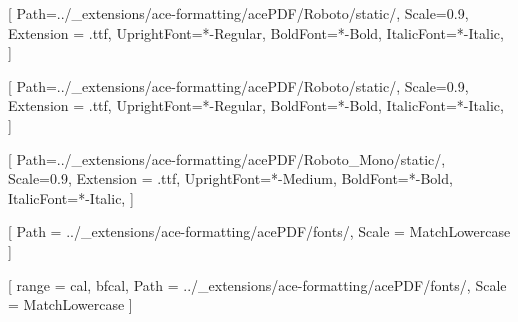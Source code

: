 {

    \hypersetup{urlcolor=highlight}

    \clearpage
    
    \setcounter{page}{1}
}
\makeatother

\setmainfont{Roboto}[
    Path=../_extensions/ace-formatting/acePDF/Roboto/static/,
    Scale=0.9,
    Extension = .ttf,
    UprightFont=*-Regular,
    BoldFont=*-Bold,
    ItalicFont=*-Italic,
    ]
    
\setsansfont{Roboto}[
    Path=../_extensions/ace-formatting/acePDF/Roboto/static/,
    Scale=0.9,
    Extension = .ttf,
    UprightFont=*-Regular,
    BoldFont=*-Bold,
    ItalicFont=*-Italic,
    ]

\setmonofont{RobotoMono}[
    Path=../_extensions/ace-formatting/acePDF/Roboto_Mono/static/,
    Scale=0.9,
    Extension = .ttf,
    UprightFont=*-Medium,
    BoldFont=*-Bold,
    ItalicFont=*-Italic,
    ]
    
[
  Path = ../_extensions/ace-formatting/acePDF/fonts/,
  Scale = MatchLowercase
]

[
  range = {cal, bfcal},
  Path = ../_extensions/ace-formatting/acePDF/fonts/,
  Scale = MatchLowercase
]

\makeatletter
\setlength{\@fptop}{0pt}
\setlength{\@fpsep}{12pt plus 2fil}
\setlength{\@fpbot}{0pt plus 1fil}
\makeatother
